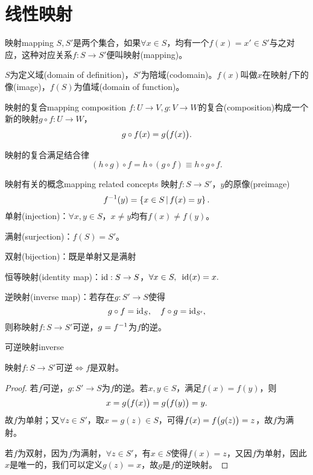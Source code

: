 \chapter{线性映射}
\label{chap:linear mapping}

\begin{definition}{映射}{mapping}
	$S,S'$是两个集合，如果$\forall x\in S$，均有一个$f(x)=x'\in S'$与之对应，这种对应关系$f:S\to S'$便叫映射(mapping)。

	$S$为定义域(domain of definition)，$S'$为陪域(codomain)。$f(x)$叫做$x$在映射$f$下的像(image)，$f(S)$为值域(domain of function)。
\end{definition}
\begin{definition}{映射的复合}{mapping composition}
	$f:U\to V,g:V\to W$的复合(composition)构成一个新的映射$g\circ f:U\to W$，
	\[
		g\circ f(x)=g\bigl(f(x)\bigr).
	\]
\end{definition}
映射的复合满足结合律
\[
	(h\circ g)\circ f=h\circ (g\circ f)\equiv h\circ g\circ f.
\]
\begin{definition}{映射有关的概念}{mapping related concepts}
	映射$f:S\to S'$，$y$的原像(preimage)
	\[
		f^{-1}(y)=\left\{x\in S\,\middle\vert\,f(x)=y\right\}.
	\]
	单射(injection)：$\forall x,y\in S$，$x\neq y$均有$f(x)\neq f(y)$。

	满射(surjection)：$f(S)=S'$。

	双射(bijection)：既是单射又是满射

	恒等映射(identity map)：$\operatorname{id}:S\to S$，$\forall x\in S,\enspace\operatorname{id}(x)=x.$

	逆映射(inverse map)：若存在$g:S'\to S$使得
	\[
		g\circ f=\operatorname{id}_S,\quad f\circ g=\operatorname{id}_{S'},
	\]
	则称映射$f:S\to S'$可逆，$g=f^{-1}$为$f$的逆。
\end{definition}
\begin{theorem}{可逆映射}{inverse}
	\begin{center}
		映射$f:S\to S'$可逆$\iff f$是双射。
	\end{center}
\end{theorem}
\begin{proof}
	若$f$可逆，$g:S'\to S$为$f$的逆。若$x,y\in S$，满足$f(x)=f(y)$，则 
	\[
		x=g\bigl(f(x)\bigr)=g\bigl(f(y)\bigr)=y.
	\]
	故$f$为单射；又$\forall z\in S'$，取$x=g(z)\in S$，可得$f(x)=f\bigl(g(z)\bigr)=z$，故$f$为满射。
	
	若$f$为双射，因为$f$为满射，$\forall z\in S'$，有$x\in S$使得$f(x)=z$，又因$f$为单射，因此$x$是唯一的，我们可以定义$g(z)=x$，故$g$是$f$的逆映射。
\end{proof}
